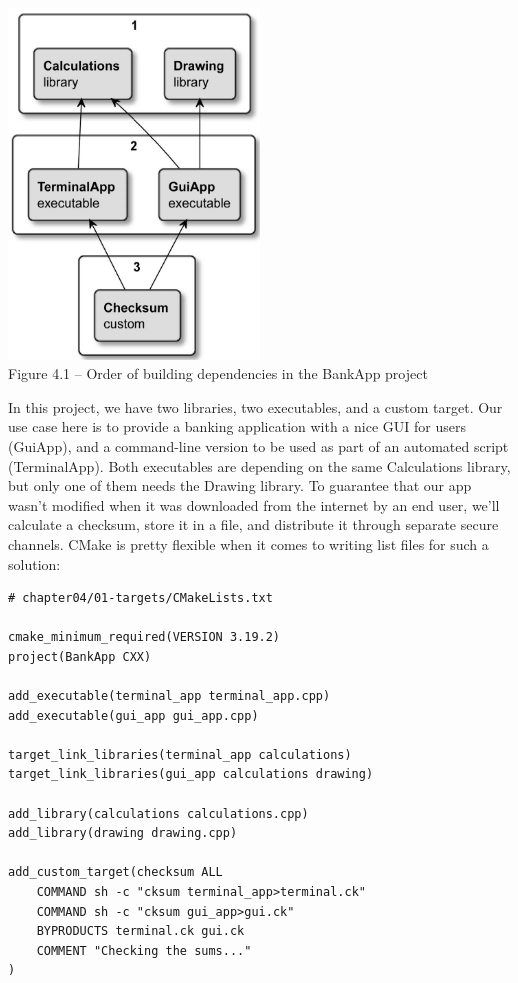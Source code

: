 \begin{center}
\includegraphics[width=0.5\textwidth]{content/2/chapter4/images/1.jpg}\\
Figure 4.1 – Order of building dependencies in the BankApp project
\end{center}

In this project, we have two libraries, two executables, and a custom target. Our use case here is to provide a banking application with a nice GUI for users (GuiApp), and a command-line version to be used as part of an automated script (TerminalApp). Both executables are depending on the same Calculations library, but only one of them needs the Drawing library. To guarantee that our app wasn't modified when it was downloaded from the internet by an end user, we'll calculate a checksum, store it in a file, and distribute it through separate secure channels. CMake is pretty flexible when it comes to writing list files for such a solution:

\begin{lstlisting}[style=styleCMake]
# chapter04/01-targets/CMakeLists.txt

cmake_minimum_required(VERSION 3.19.2)
project(BankApp CXX)

add_executable(terminal_app terminal_app.cpp)
add_executable(gui_app gui_app.cpp)

target_link_libraries(terminal_app calculations)
target_link_libraries(gui_app calculations drawing)

add_library(calculations calculations.cpp)
add_library(drawing drawing.cpp)

add_custom_target(checksum ALL
	COMMAND sh -c "cksum terminal_app>terminal.ck"
	COMMAND sh -c "cksum gui_app>gui.ck"
	BYPRODUCTS terminal.ck gui.ck
	COMMENT "Checking the sums..."
)
\end{lstlisting}


